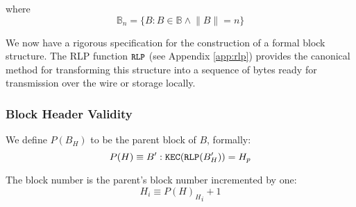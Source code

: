 \documentclass[9pt,oneside]{amsart}
\begin{document}
\begin{multicols}{2}
where
\begin{equation}
\mathbb{B}_n = \{ B: B \in \mathbb{B} \wedge \lVert B \rVert = n \}
\end{equation}

We now have a rigorous specification for the construction of a formal block structure. The RLP function $\texttt{\small RLP}$ (see Appendix \ref{app:rlp}) provides the canonical method for transforming this structure into a sequence of bytes ready for transmission over the wire or storage locally.

\subsubsection{Block Header Validity}

We define $P(B_H)$ to be the parent block of $B$, formally:
\begin{equation}
P(H) \equiv B': \mathtt{\tiny KEC}(\mathtt{\tiny RLP}(B'_H)) = H_p
\end{equation}

The block number is the parent's block number incremented by one:
\begin{equation}
H_i \equiv {{P(H)_H}_i} + 1
\end{equation}

\newcommand{\mindifficulty}{D_0}
\newcommand{\frontiermod}{\ensuremath{\varsigma_1}}
\newcommand{\homesteadmod}{\ensuremath{\varsigma_2}}
\newcommand{\expdiffsymb}{\ensuremath{\epsilon}}
\newcommand{\diffadjustment}{x}


\end{multicols}
\end{document}
